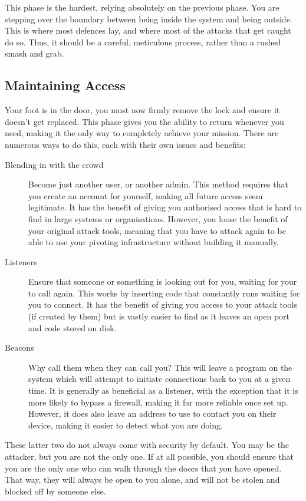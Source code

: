 			This phase is the hardest, relying absolutely on the previous phase. 
			You are stepping over the boundary between being inside the system and being outside. 
			This is where most defences lay, and where most of the attacks that get caught do so. 
			Thus, it should be a careful, meticulous process, rather than a rushed smash and grab. 
		\subsection{Maintaining Access}
			Your foot is in the door, you must now firmly remove the lock and ensure it doesn't get replaced. 
			This phase gives you the ability to return whenever you need, making it the only way to completely achieve your mission. 
			There are numerous ways to do this, each with their own issues and benefits:
			\begin{description}
				\item[Blending in with the crowd] Become just another user, or another admin. 
					This method requires that you create an account for yourself, making all future access seem legitimate. 
					It has the benefit of giving you authorised access that is hard to find in large systems or organisations. 
					However, you loose the benefit of your original attack tools, meaning that you have to attack again to be able to use your pivoting infrastructure without building it manually. 
				\item[Listeners] Ensure that someone or something is looking out for you, waiting for your to call again. 
					This works by inserting code that constantly runs waiting for you to connect. 
					It has the benefit of giving you access to your attack tools (if created by them) 
					but is vastly easier to find as it leaves an open port and code stored on disk. 
				\item[Beacons] Why call them when they can call you?
					This will leave a program on the system which will attempt to initiate connections back to you at a given time. 
					It is generally as beneficial as a listener, with the exception that it is more likely to bypass a firewall, 
					making it far more reliable once set up. 
					However, it does also leave an address to use to contact you on their device, making it easier to detect what you are doing. 
			\end{description}
			These latter two do not always come with security by default. 
			You may be the attacker, but you are not the only one. 
			If at all possible, you should ensure that you are the only one who can walk through the doors that you have opened. 
			That way, they will always be open to you alone, and will not be stolen and blocked off by someone else. 
			
